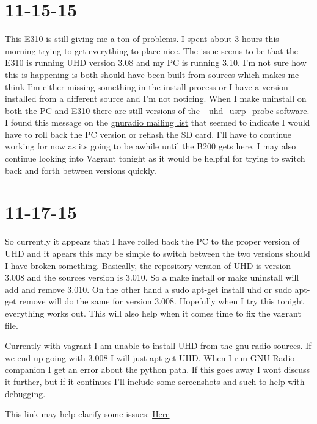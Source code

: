 \documentclass{article}
\begin{document}
	\section{11-15-15}
	This E310 is still giving me a ton of problems. I spent about 3 hours this
	morning trying to get everything to place nice. The issue seems to be that
	the E310 is running UHD version  3.08 and my PC is running 3.10. I'm not
	sure how this is happening is both should have been built from sources
	which makes me think I'm either missing something in the install process
	or I have a version installed from a different source and I'm not noticing.
	When I make uninstall on both the PC and E310 there are still versions
	of the \_uhd\_usrp\_probe software. I found this message on the
	\href{http://lists.ettus.com/pipermail/usrp-users_lists.ettus.com/2015-April/013716.html}{gnuradio mailing list} that seemed to indicate I would have to roll
	back the PC version or reflash the SD card. I'll have to continue working
	for now as its going to be awhile until the B200 gets here. I may
	also continue looking into Vagrant tonight as it would be helpful
	for trying to switch back and forth between versions quickly. 


	\section{11-17-15}
	So currently it appears that I have rolled back the PC to the proper
	version of UHD and it apears this may be simple to switch between the two
	versions should I have broken something. Basically, the repository version
	of UHD is version 3.008 and the sources version is 3.010. So a 
	make install or make uninstall will add and remove 3.010. On the other
	hand a sudo apt-get install uhd or sudo apt-get remove will do the 
	same for version 3.008. Hopefully when I try this tonight everything works
	out. This will also help when it comes time to fix the vagrant file.
	
	Currently with vagrant I am unable to install UHD from the gnu radio
	sources. If we end up going with 3.008 I will just apt-get UHD. When I 
	run GNU-Radio companion I get an error about the python path. If this
	goes away I wont discuss it further, but if it continues I'll include
	some screenshots and such to help with debugging. 

	This link may help clarify some issues: 
	\href{https://lists.gnu.org/archive/html/discuss-gnuradio/2015-08/msg00459.html}{Here}
\end{document}

